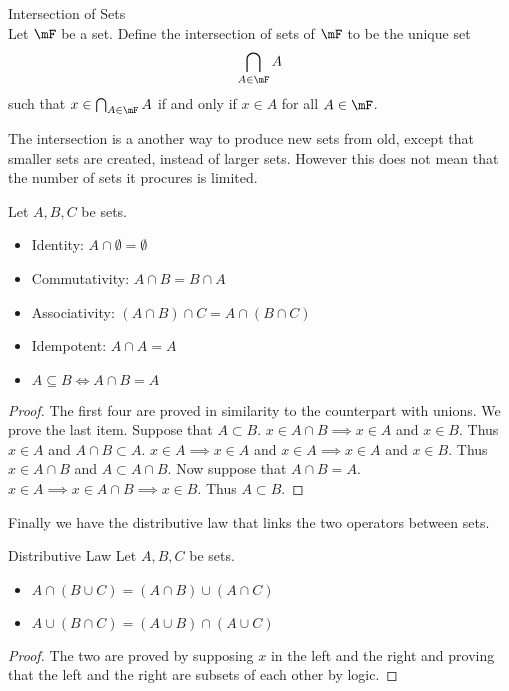 \documentclass[a4paper]{article}
\begin{document}
\begin{defn}{Intersection of Sets}{}\\
Let $\mF$ be a set. Define the intersection of sets of $\mF$ to be the unique set $$\bigcap_{A\in\mF}A$$ such that $x\in\bigcap_{A\in\mF}A$ if and only if $x\in A$ for all $A\in\mF$. 
\end{defn}

The intersection is a another way to produce new sets from old, except that smaller sets are created, instead of larger sets. However this does not mean that the number of sets it procures is limited. 

\begin{lmm}{}{} Let $A,B,C$ be sets. 
\begin{itemize}
\item Identity: $A\cap\emptyset=\emptyset$
\item Commutativity: $A\cap B=B\cap A$
\item Associativity: $(A\cap B)\cap C=A\cap(B\cap C)$
\item Idempotent: $A\cap A=A$
\item $A\subseteq B\iff A\cap B=A$
\end{itemize}
\begin{proof} The first four are proved in similarity to the counterpart with unions. We prove the last item. Suppose that $A\subset B$. $x\in A\cap B\implies x\in A$ and $x\in B$. Thus $x\in A$ and $A\cap B\subset A$. $x\in A\implies x\in A$ and $x\in A\implies x\in A$ and $x\in B$. Thus $x\in A\cap B$ and $A\subset A\cap B$. Now suppose that $A\cap B=A$. $x\in A\implies x\in A\cap B\implies x\in B$. Thus $A\subset B$. 
\end{proof}
\end{lmm}

Finally we have the distributive law that links the two operators between sets. 

\begin{prp}{Distributive Law}{} Let $A,B,C$ be sets. 
\begin{itemize}
\item $A\cap(B\cup C)=(A\cap B)\cup(A\cap C)$
\item $A\cup(B\cap C)=(A\cup B)\cap(A\cup C)$
\end{itemize}
\begin{proof} The two are proved by supposing $x$ in the left and the right and proving that the left and the right are subsets of each other by logic. 
\end{proof}
\end{prp}
\end{document}
